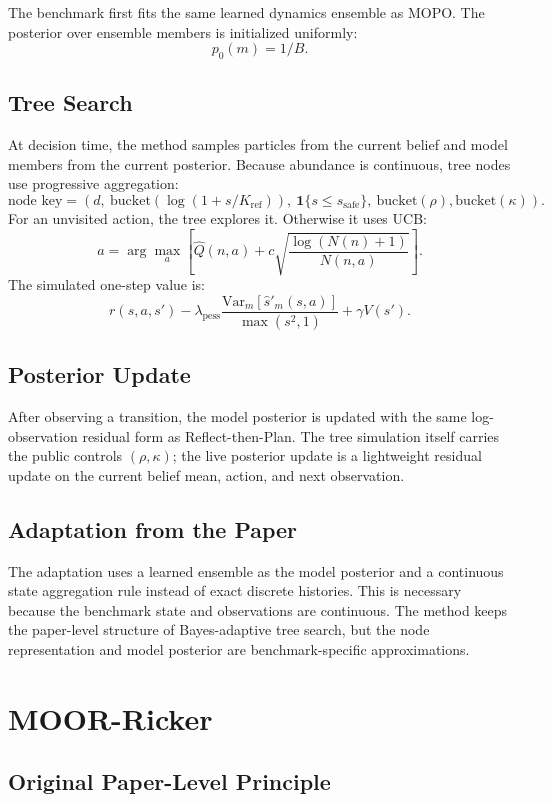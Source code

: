 \documentclass[11pt]{article}
\newcommand{\Var}{\mathrm{Var}}
\newcommand{\1}{\mathbf{1}}
\begin{document}
The benchmark first fits the same learned dynamics ensemble as MOPO.  The
posterior over ensemble members is initialized uniformly:
\[
  p_0(m)=1/B.
\]

\subsection{Tree Search}

At decision time, the method samples particles from the current belief and model
members from the current posterior.  Because abundance is continuous, tree nodes
use progressive aggregation:
\[
  \text{node key} =
  (d,\ \mathrm{bucket}(\log(1+s/K_{\mathrm{ref}})),\
   \1\{s\le s_{\mathrm{safe}}\},\
   \mathrm{bucket}(\rho),\mathrm{bucket}(\kappa)).
\]
For an unvisited action, the tree explores it.  Otherwise it uses UCB:
\[
  a=\arg\max_a
  \left[
    \hat{Q}(n,a)+c\sqrt{\frac{\log(N(n)+1)}{N(n,a)}}
  \right].
\]
The simulated one-step value is:
\[
  r(s,a,s')-\lambda_{\mathrm{pess}}
  \frac{\Var_m[\hat{s}'_m(s,a)]}{\max(s^2,1)}
  +\gamma V(s').
\]

\subsection{Posterior Update}

After observing a transition, the model posterior is updated with the same
log-observation residual form as Reflect-then-Plan.  The tree simulation itself
carries the public controls $(\rho,\kappa)$; the live posterior update is a
lightweight residual update on the current belief mean, action, and next
observation.

\subsection{Adaptation from the Paper}

The adaptation uses a learned ensemble as the model posterior and a continuous
state aggregation rule instead of exact discrete histories.  This is necessary
because the benchmark state and observations are continuous.  The method keeps
the paper-level structure of Bayes-adaptive tree search, but the node
representation and model posterior are benchmark-specific approximations.

\section{MOOR-Ricker}

\subsection{Original Paper-Level Principle}
\end{document}
